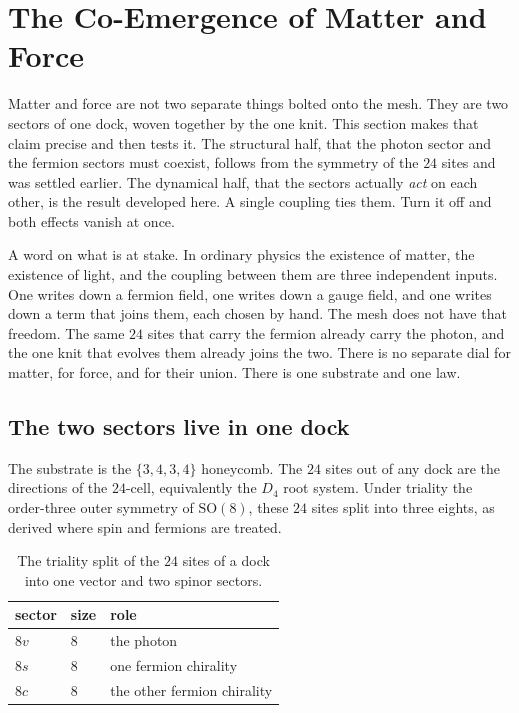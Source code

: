 \section{The Co-Emergence of Matter and Force}

Matter and force are not two separate things bolted onto the mesh. They are two sectors of one dock, woven together by the one knit. This section makes that claim precise and then tests it. The structural half, that the photon sector and the fermion sectors must coexist, follows from the symmetry of the $24$ sites and was settled earlier. The dynamical half, that the sectors actually \emph{act} on each other, is the result developed here. A single coupling ties them. Turn it off and both effects vanish at once.

A word on what is at stake. In ordinary physics the existence of matter, the existence of light, and the coupling between them are three independent inputs. One writes down a fermion field, one writes down a gauge field, and one writes down a term that joins them, each chosen by hand. The mesh does not have that freedom. The same $24$ sites that carry the fermion already carry the photon, and the one knit that evolves them already joins the two. There is no separate dial for matter, for force, and for their union. There is one substrate and one law.

\subsection{The two sectors live in one dock}

The substrate is the $\{3,4,3,4\}$ honeycomb. The $24$ sites out of any dock are the directions of the $24$-cell, equivalently the $D_4$ root system. Under triality the order-three outer symmetry of $\mathrm{SO}(8)$, these $24$ sites split into three eights, as derived where spin and fermions are treated.

\begin{table}[ht]
\centering
\begin{tabular}{@{}lll@{}}
\toprule
sector & size & role \\
\midrule
$8v$ & $8$ & the photon \\
$8s$ & $8$ & one fermion chirality \\
$8c$ & $8$ & the other fermion chirality \\
\bottomrule
\end{tabular}
\caption{The triality split of the $24$ sites of a dock into one vector and two spinor sectors.}
\label{tab:co-emergence-sectors}
\end{table}

